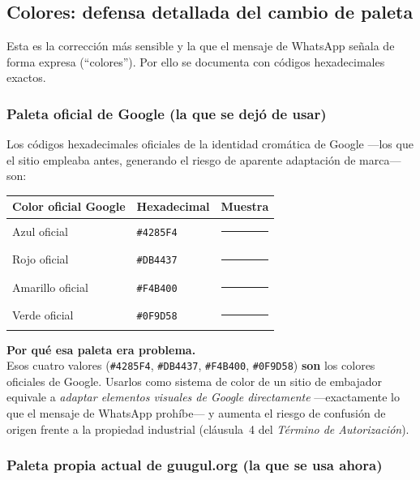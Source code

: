 \documentclass[11pt,a4paper]{article}
\begin{document}
\subsection{Colores: defensa detallada del cambio de paleta}

Esta es la corrección más sensible y la que el mensaje de WhatsApp señala de forma expresa (\enquote{colores}). Por ello se documenta con códigos hexadecimales exactos.

\subsubsection{Paleta oficial de Google (la que se dejó de usar)}

Los códigos hexadecimales oficiales de la identidad cromática de Google ---los que el sitio empleaba antes, generando el riesgo de aparente adaptación de marca--- son:

\begin{center}
\renewcommand{\arraystretch}{1.35}
\begin{tabular}{@{}llc@{}}
\toprule
\textbf{Color oficial Google} & \textbf{Hexadecimal} & \textbf{Muestra} \\
\midrule
Azul oficial & \texttt{\#4285F4} & \textcolor{GoogleBlue}{\rule{1.6cm}{0.55cm}} \\
Rojo oficial & \texttt{\#DB4437} & \textcolor{GoogleRed}{\rule{1.6cm}{0.55cm}} \\
Amarillo oficial & \texttt{\#F4B400} & \textcolor{GoogleYellow}{\rule{1.6cm}{0.55cm}} \\
Verde oficial & \texttt{\#0F9D58} & \textcolor{GoogleGreen}{\rule{1.6cm}{0.55cm}} \\
\bottomrule
\end{tabular}
\end{center}

\begin{riesgobox}
\noindent\textbf{Por qué esa paleta era problema.}\\[0.3em]
Esos cuatro valores (\texttt{\#4285F4}, \texttt{\#DB4437}, \texttt{\#F4B400}, \texttt{\#0F9D58}) \textbf{son} los colores oficiales de Google. Usarlos como sistema de color de un sitio de embajador equivale a \emph{adaptar elementos visuales de Google directamente} ---exactamente lo que el mensaje de WhatsApp prohíbe--- y aumenta el riesgo de confusión de origen frente a la propiedad industrial (cláusula~4 del \emph{Término de Autorización}).
\end{riesgobox}

\subsubsection{Paleta propia actual de guugul.org (la que se usa ahora)}
\end{document}
